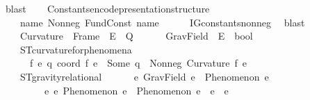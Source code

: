 \begin{isabellebody}
\ blast%
\endisatagproof
{\isafoldproof}%
%
\isadelimproof
\isanewline
%
\endisadelimproof
\isanewline
\ \ \isamarkupfalse%
\ Constants{\isacharunderscore}{\kern0pt}encode{\isacharunderscore}{\kern0pt}presentation{\isacharunderscore}{\kern0pt}structure{\isacharcolon}{\kern0pt}\isanewline
\ \ \ \ {\isachardoublequoteopen}{\isasymforall}name{\isachardot}{\kern0pt}\ Nonneg\ {\isacharparenleft}{\kern0pt}FundConst\ name{\isacharparenright}{\kern0pt}{\isachardoublequoteclose}\isanewline
%
\isadelimproof
\ \ \ \ %
\endisadelimproof
%
\isatagproof
{}\isamarkupfalse%
\ IG{}{\isacharunderscore}{\kern0pt}constants{\isacharunderscore}{\kern0pt}nonneg\ \isamarkupfalse%
\ blast%
\endisatagproof
{\isafoldproof}%
%
\isadelimproof
%
\endisadelimproof
%
\isadelimdocument
%
\endisadelimdocument
%
\isatagdocument
%
\isamarkuptrue%
%
\endisatagdocument
{\isafolddocument}%
%
\isadelimdocument
%
\endisadelimdocument
\ \ \isamarkupfalse%
\isanewline
\ \ \ \ Curvature\ {\isacharcolon}{\kern0pt}{\isacharcolon}{\kern0pt}\ {\isachardoublequoteopen}Frame\ {\isasymRightarrow}\ E\ {\isasymRightarrow}\ Q{\isachardoublequoteclose}\ \ \isanewline
\ \ \ \ GravField\ {\isacharcolon}{\kern0pt}{\isacharcolon}{\kern0pt}\ {\isachardoublequoteopen}E\ {\isasymRightarrow}\ bool{\isachardoublequoteclose}\ \ \ \ \ \ \ \ \ \ \isanewline
\isanewline
\ \ \isamarkupfalse%
\ \isanewline
\ \ \ \ ST{}{\isacharunderscore}{\kern0pt}curvature{\isacharunderscore}{\kern0pt}for{\isacharunderscore}{\kern0pt}phenomena{\isacharcolon}{\kern0pt}\isanewline
\ \ \ \ \ \ {\isachardoublequoteopen}{\isasymforall}f\ e\ q{\isachardot}{\kern0pt}\ coord\ f\ e\ {\isacharequal}{\kern0pt}\ Some\ q\ {\isasymlongrightarrow}\ Nonneg\ {\isacharparenleft}{\kern0pt}Curvature\ f\ e{\isacharparenright}{\kern0pt}{\isachardoublequoteclose}\ \isanewline
\ \ \ \ ST{}{\isacharunderscore}{\kern0pt}gravity{\isacharunderscore}{\kern0pt}relational{\isacharcolon}{\kern0pt}\isanewline
\ \ \ \ \ \ {\isachardoublequoteopen}{\isasymforall}e{\isachardot}{\kern0pt}\ GravField\ e\ {\isasymlongrightarrow}\ Phenomenon\ e\ {\isasymand}\isanewline
\ \ \ \ \ \ \ \ \ {\isacharparenleft}{\kern0pt}{\isasymexists}e{}\ e{}{\isachardot}{\kern0pt}\ Phenomenon\ e{}\ {\isasymand}\ Phenomenon\ e{}\ {\isasymand}\ e{}\ {\isasymnoteq}\ e{}{\isacharparenright}{\kern0pt}{\isachardoublequoteclose}\ \isanewline

\end{isabellebody}
